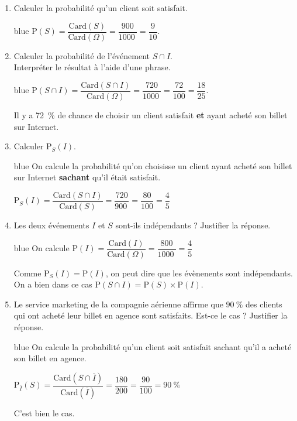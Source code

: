 \documentclass[10pt]{article}
\providecommand{\np}[2][]{{#2~#1}}
\begin{document}
	\begin{enumerate}
		\item Calculer la probabilité qu'un client soit satisfait.
		
		\begin{color}{blue}
	$\text{P}(S) = \dfrac{\text{Card}(S)}{\text{Card}(\Omega)} = \dfrac{900}{\np{1000}} = \dfrac{9}{10}$.
	\end{color}

		
		\item Calculer la probabilité de l'événement $S\cap I$. \\
		Interpréter le résultat à l'aide d'une phrase.
		
		\begin{color}{blue}
	$\text{P}(S\cap I) = \dfrac{\text{Card}(S\cap I)}{\text{Card}(\Omega)} = \dfrac{720}{\np{1000}} = \dfrac{72}{100} = \dfrac{18}{25}$.
	
	Il y a 72~\% de chance de choisir un client satisfait \textbf{et} ayant acheté son billet sur Internet. 
	\end{color}
		
		\item Calculer $\text{P}_{S}(I)$.
		
		\begin{color}{blue}
On calcule la probabilité qu'on choisisse un client ayant acheté son billet  sur Internet \textbf{sachant}	 qu'il était satisfait.
		
		$\text{P}_{S}(I)= \dfrac{\text{Card}(S\cap I)}{\text{Card}(S)} = \dfrac{720}{\np{900}} = \dfrac{80}{100} = \dfrac{4}{5}$
		
		\end{color}
		
		\item Les deux événements $I$ et $S$ sont-ils indépendants ? Justifier la réponse.
		
		\begin{color}{blue}
		On calcule $\text{P}(I) = \dfrac{\text{Card}(I)}{\text{Card}(\Omega)} = \dfrac{800}{\np{1000}} = \dfrac{4}{5}$
		
		Comme $\text{P}_{S}(I)=\text{P}(I)$, on peut dire que les évènenents sont indépendants. On a bien dans ce cas $\text{P}(S\cap I) = \text{P}(S) \times \text{P}(I)$.
		\end{color}
		\item Le service marketing de la compagnie aérienne affirme que $90~\%$ des clients qui ont acheté leur billet en agence sont satisfaits. Est-ce le cas ? Justifier la réponse.
		
		\begin{color}{blue}
		On calcule la probabilité qu'un client soit satisfait sachant qu'il a acheté son billet en agence.
		
		$\text{P}_{\overline{I}}(S) = \dfrac{\text{Card}(S\cap \overline{I})}{\text{Card}(\overline{I})} = \dfrac{180}{200} = \dfrac{90}{100} = 90~\%$
		
		C'est bien le cas.
		
		\end{color}
	\end{enumerate}
\end{document}
